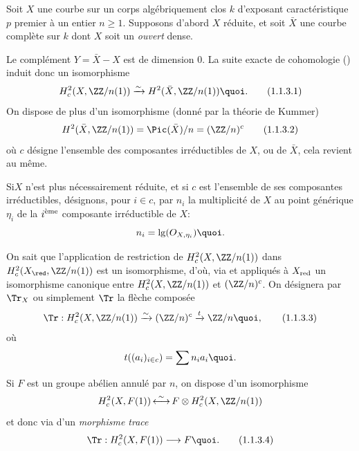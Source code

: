\setcounter{subsubsection}{2}
\subsubsection{}
Soit $X$ une courbe sur un corps algébriquement clos $k$ d'exposant
caractéristique $p$ premier à un entier $n\geq 1$. Supposons d'abord
$X$ réduite, et soit $\bar{X}$ une courbe complète sur $k$ dont $X$
soit un \emph{ouvert} dense.

Le complément $Y=\bar{X}-X$ est de dimension $0$. La suite exacte de
cohomologie () induit donc un isomorphisme
\begin{equation*}
H^{2}_{c}(X,\ZZ/n(1))\xrightarrow{\sim} H^{2}(\bar{X},\ZZ/n(1)){\quoi}.\tag{1.1.3.1}
\end{equation*}%
On dispose de plus d'un isomorphisme  (donné par la théorie de
Kummer)
\begin{equation*}
H^{2}(\bar{X},\ZZ/n(1))=\Pic(\bar{X})/n=(\ZZ/n)^{c}\tag{1.1.3.2}
\end{equation*}%
où $c$ désigne l'ensemble des composantes irréductibles de $X$, ou de
$\bar{X}$, cela revient au même.

Si\pageoriginale $X$ n'est plus nécessairement réduite, et si $c$ est
l'ensemble de ses composantes irréductibles, désignons, pour $i\in c$,
par $n_{i}$ la multiplicité de $X$ au point générique $\eta_{i}$ de la
$i^{\text{\rm ème}}$ composante irréductible de $X$:
$$
n_{i}=\lg(O_{X,\eta_{i}}){\quoi}.
$$

On sait que l'application de restriction de
$H^{2}_{c}(X,\ZZ/n(1))$ dans $H^{2}_{c}(X_{\red},
\ZZ/n(1))$ est un isomorphisme, d'où, via 
et  appliqués à $X_{\text{\rm red}}$ un isomorphisme
canonique entre $H^{2}_{c}(X,\ZZ/n(1))$ et
$(\ZZ/n)^{c}$. On désignera par $\Tr_{X}$ ou simplement $\Tr$
la flèche composée
\begin{equation*}
\Tr:H^{2}_{c}(X,\ZZ/n(1))\xrightarrow{\sim}(\ZZ/n)^{c}\xrightarrow{t}\ZZ/n{\quoi},\tag{1.1.3.3}
\end{equation*}%
où
$$
t((a_{i})_{i\in c})=\sum n_{i}a_{i}{\quoi}.
$$

Si $F$ est un groupe abélien annulé par $n$, on dispose d'un
isomorphisme
$$
H^{2}_{c}(X,F(1))\mathop{\longleftrightarrow}^{\sim}F\otimes
H^{2}_{c}(X,\ZZ/n(1))
$$
et donc via  d'un \emph{morphisme trace}
\begin{equation*}
\Tr:H^{2}_{c}(X,F(1))\longrightarrow F{\quoi}.\tag{1.1.3.4}
\end{equation*}

